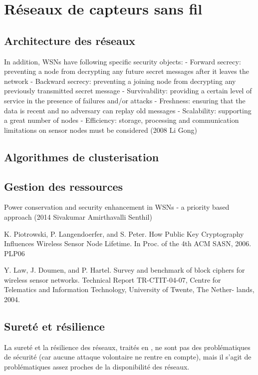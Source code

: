 \section{Réseaux de capteurs sans fil}

\subsection{Architecture des réseaux}


In addition, WSNs have following specific security objects:
- Forward secrecy: preventing a node from decrypting any future secret messages after it
leaves the network
- Backward secrecy: preventing a joining node from decrypting any previously transmitted
secret message
- Survivability: providing a certain level of service in the presence of failures and/or
attacks
- Freshness: ensuring that the data is recent and no adversary can replay old messages
- Scalability: supporting a great number of nodes
- Efficiency: storage, processing and communication limitations on sensor nodes must be
considered
(2008 Li Gong)





\subsection{Algorithmes de clusterisation}

\subsection{Gestion des ressources}

Power conservation and security enhancement in WSNs - a priority based approach (2014 Sivakumar Amirthavalli Senthil)

K. Piotrowski, P. Langendoerfer, and S. Peter. How Public Key Cryptography Influences Wireless Sensor Node Lifetime. In Proc. of the 4th ACM SASN, 2006.
PLP06

Y. Law, J. Doumen, and P. Hartel. Survey and benchmark of block ciphers for wireless sensor networks. Technical Report TR-CTIT-04-07, Centre for Telematics and Information Technology, University of Twente, The Nether- lands, 2004.

\subsection{Sureté et résilience}\label{ea:ssec:safety}

La sureté et la résilience des réseaux, traités en , ne sont pas des problématiques de sécurité (car aucune attaque volontaire ne rentre en compte), mais il s'agit de problématiques assez proches de la disponibilité des réseaux.


